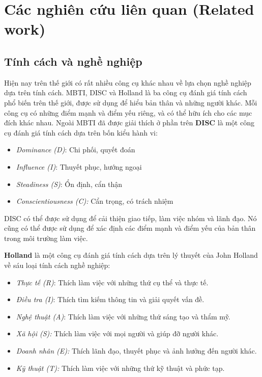 \section{Các nghiên cứu liên quan (Related work)} 

\subsection{Tính cách và nghề nghiệp}
Hiện nay trên thế giới có rất nhiều công cụ khác nhau về lựa chọn nghề nghiệp dựa trên tính cách. MBTI, DISC và Holland là ba công cụ đánh giá tính cách phổ biến trên thế giới, được sử dụng để hiểu bản thân và những người khác. Mỗi công cụ có những điểm mạnh và điểm yếu riêng, và có thể hữu ích cho các mục đích khác nhau. Ngoài MBTI đã được giải thích ở phần trên
\textbf{DISC} là một công cụ đánh giá tính cách dựa trên bốn kiểu hành vi:
\begin{itemize}
    \item \textit{Dominance (D)}: Chi phối, quyết đoán
    \item \textit{Influence (I)}: Thuyết phục, hướng ngoại
    \item \textit{Steadiness (S)}: Ổn định, cẩn thận
    \item \textit{Conscientiousness (C):} Cẩn trọng, có trách nhiệm
\end{itemize}

DISC có thể được sử dụng để cải thiện giao tiếp, làm việc nhóm và lãnh đạo. Nó cũng có thể được sử dụng để xác định các điểm mạnh và điểm yếu của bản thân trong môi trường làm việc.

\textbf{Holland} là một công cụ đánh giá tính cách dựa trên lý thuyết của John Holland về sáu loại tính cách nghề nghiệp:
\begin{itemize}
    \item \textit{Thực tế (R)}: Thích làm việc với những thứ cụ thể và thực tế.
    \item \textit{Điều tra (I)}: Thích tìm kiếm thông tin và giải quyết vấn đề.
    \item \textit{Nghệ thuật (A)}: Thích làm việc với những thứ sáng tạo và thẩm mỹ.
    \item \textit{Xã hội (S):} Thích làm việc với mọi người và giúp đỡ người khác.
    \item \textit{Doanh nhân (E):} Thích lãnh đạo, thuyết phục và ảnh hưởng đến người khác.
    \item \textit{Kỹ thuật (T):} Thích làm việc với những thứ kỹ thuật và phức tạp.
\end{itemize}

